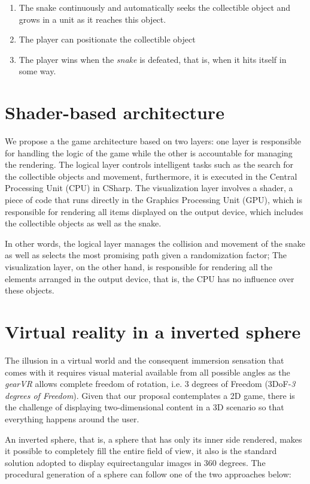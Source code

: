 \documentclass[12pt]{article}
\begin{document}
\begin{enumerate}
\item The snake continuously and automatically seeks the collectible object and grows in a unit as it reaches this object.
\item The player can positionate the collectible object
\item The player wins when the \textit{snake} is defeated, that is, when it hits itself in some way.

\end{enumerate}

\section{Shader-based architecture}
 \label{sec:architecture}
We propose a the game architecture based on two layers: one layer is responsible for handling the logic of the game while the other is accountable for managing the rendering.  The logical layer controls intelligent tasks such as the search for the collectible objects and movement, furthermore, it is executed in the Central Processing Unit (CPU) in CSharp. The visualization layer involves a shader, a piece of code that runs directly in the Graphics Processing Unit (GPU), which is responsible for rendering all items displayed on the output device, which includes the collectible objects as well as the snake.

In other words, the logical layer manages the collision and movement of the snake as well as selects the most promising path given a randomization factor; The visualization layer, on the other hand, is responsible for rendering all the elements arranged in the output device, that is, the CPU has no influence over these objects.

\section{Virtual reality in a inverted sphere}
The illusion in a virtual world and the consequent immersion sensation that comes with it requires visual material available from all possible angles as the \textit{gearVR} allows complete freedom of rotation, i.e. 3 degrees of Freedom (3DoF-\textit{3 degrees of Freedom}). Given that our proposal contemplates a 2D game, there is the challenge of displaying two-dimensional content in a 3D scenario so that everything happens around the user.

An inverted sphere, that is, a sphere that has only its inner side rendered, makes it possible to completely fill the entire field of view, it also is the standard solution adopted to display equirectangular images in 360 degrees. The procedural generation of a sphere can follow one of the two approaches below:
\end{document}
